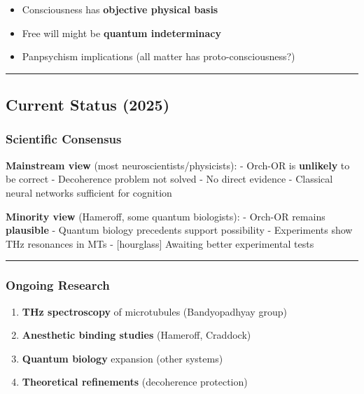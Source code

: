 \begin{itemize}
\tightlist
\item
  Consciousness has \textbf{objective physical basis}
\item
  Free will might be \textbf{quantum indeterminacy}
\item
  Panpsychism implications (all matter has proto-consciousness?)
\end{itemize}

\begin{center}\rule{0.5\linewidth}{0.5pt}\end{center}

\subsection{Current Status (2025)}\label{current-status-2025}

\subsubsection{Scientific Consensus}\label{scientific-consensus}

\textbf{Mainstream view} (most neuroscientists/physicists): - Orch-OR is
\textbf{unlikely} to be correct - Decoherence problem not solved - No
direct evidence - Classical neural networks sufficient for cognition

\textbf{Minority view} (Hameroff, some quantum biologists): - Orch-OR
remains \textbf{plausible} - Quantum biology precedents support
possibility - Experiments show THz resonances in MTs - {[}hourglass{]}
Awaiting better experimental tests

\begin{center}\rule{0.5\linewidth}{0.5pt}\end{center}

\subsubsection{Ongoing Research}\label{ongoing-research}

\begin{enumerate}
\def\labelenumi{\arabic{enumi}.}
\tightlist
\item
  \textbf{THz spectroscopy} of microtubules (Bandyopadhyay group)
\item
  \textbf{Anesthetic binding studies} (Hameroff, Craddock)
\item
  \textbf{Quantum biology} expansion (other systems)
\item
  \textbf{Theoretical refinements} (decoherence protection)
\end{enumerate}

